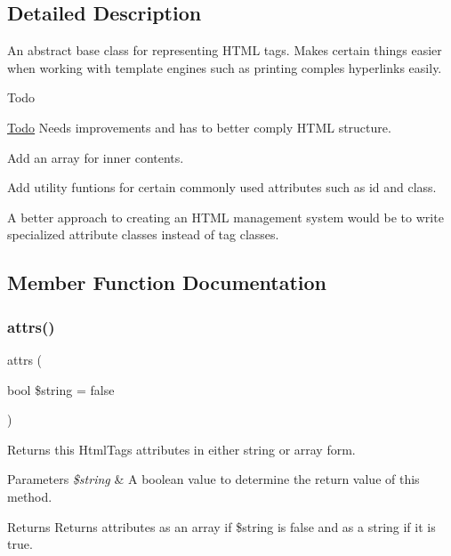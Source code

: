 \subsection{Detailed Description}
An abstract base class for representing H\+T\+ML tags. Makes certain things easier when working with template engines such as printing comples hyperlinks easily. \begin{DoxyRefDesc}{Todo}
\item[\hyperlink{todo__todo000012}{Todo}]Needs improvements and has to better comply H\+T\+ML structure.
\begin{DoxyItemize}
\item Add an array for inner contents.
\item Add utility funtions for certain commonly used attributes such as id and class.
\item A better approach to creating an H\+T\+ML management system would be to write specialized attribute classes instead of tag classes. 
\end{DoxyItemize}\end{DoxyRefDesc}


\subsection{Member Function Documentation}
\mbox{\label{class_html_1_1_html_tag_a75ef0c456595eaa6a574c438803fb072}} 
\subsubsection{\texorpdfstring{attrs()}{attrs()}}
{\footnotesize\ttfamily attrs (\begin{DoxyParamCaption}\item[{bool}]{\$string = {\ttfamily false} }\end{DoxyParamCaption})}

Returns this Html\+Tags attributes in either string or array form. 
\begin{DoxyParams}{Parameters}
{\em \$string} & A boolean value to determine the return value of this method. \\
\hline
\end{DoxyParams}
\begin{DoxyReturn}{Returns}
Returns attributes as an array if \$string is false and as a string if it is true. 
\end{DoxyReturn}


